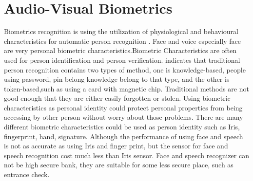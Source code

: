 \section{Audio-Visual Biometrics}
Biometrics recognition is using the utilization of physiological and behavioural characteristics for automatic person recognition \cite{aleksic2006audio}. Face and voice especially face are very personal biometric characteristics.Biometric Characteristics are often used for person identification and person verification. \cite{aleksic2006audio} indicates that traditional person recognition contains two types of method, one is knowledge-based, people using password, pin belong knowledge belong to that type, and the other is token-based,such as using a card with magnetic chip. Traditional methods are not good enough that they are either easily forgotten or stolen. Using biometric characteristics as personal identity could protect personal properties from being accessing by other person without worry about those problems. There are many different biometric characteristics could be used as person identity such as Iris, fingerprint, hand, signature. Although the performance of using face and speech is not as accurate as using Iris and finger print, but the sensor for face and speech recognition cost much less than Iris sensor. Face and speech recognizer can not be high secure bank, they are suitable for some less secure place, such as entrance check.